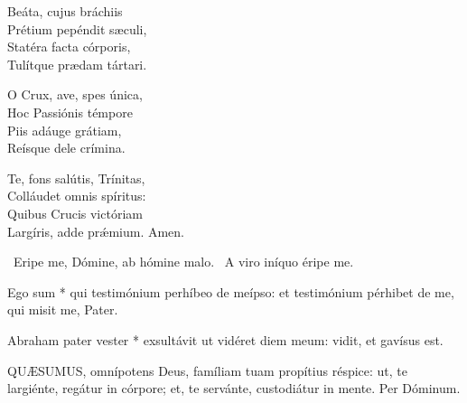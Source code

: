 Beáta, cujus bráchiis\\
Prétium pepéndit sæculi,\\
Statéra facta córporis,\\
Tulítque prædam tártari.


O Crux, ave, spes única,\\
Hoc Passiónis témpore\\
Piis adáuge grátiam,\\
Reísque dele crímina.

Te, fons salútis, Trínitas,\\
Colláudet omnis spíritus:\\
Quibus Crucis victóriam\\
Largíris, adde prǽmium. Amen.

\V\ Eripe me, Dómine, ab hómine malo. \R\ A viro iníquo éripe me.

 Ego sum * qui testimónium perhíbeo de meípso: et testimónium pérhibet de me, qui misit me, Pater.


 Abraham pater vester * exsultávit ut vidéret diem meum: vidit, et gavísus est.


\lettrine[lines=2]{Q}{UÆSUMUS}, omnípotens Deus, famíliam tuam propítius réspice: ut, te largiénte, regátur in córpore; et, te servánte, custodiátur in mente. Per Dóminum.



\sectionornament

